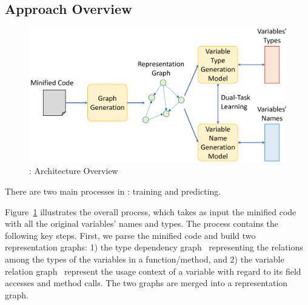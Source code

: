 \subsection{Approach Overview}


\begin{figure}[t]
	\begin{center}
	  \includegraphics[width=\columnwidth]{figures/overview.png}
          \vspace{-15pt}
		\caption{{\tool}: Architecture Overview}
		\label{overview}
	\end{center}
\end{figure}


There are two main processes in {\tool}: training and predicting.

Figure~\ref{overview} illustrates the overall process, which takes as
input the minified code with all the original variables' names and
types. The process contains the following key steps. First, we parse
the minified code and build two representation graphs: 1) the type
dependency graph~\cite{type-graph-icse22} representing the relations
among the types of the variables in a function/method, and 2) the
variable relation graph~\cite{icse19} represent the usage context of a
variable with regard to its field accesses and method calls. The two
graphs are merged into a representation graph.

